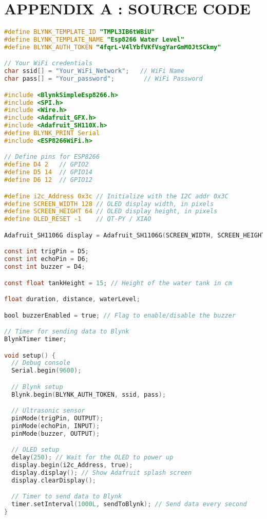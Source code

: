 \section*{APPENDIX A : SOURCE CODE}
        
\begin{lstlisting}[language=C]    
#define BLYNK_TEMPLATE_ID "TMPL3IB6tWBiU"
#define BLYNK_TEMPLATE_NAME "Esp8266 Water Level"
#define BLYNK_AUTH_TOKEN "4fqrL-V4lYbfVKfVsgYarGmM0JtSCkmy"

// Your WiFi credentials
char ssid[] = "Your_WiFi_Network";   // WiFi Name
char pass[] = "Your_password";        // WiFi Password

#include <BlynkSimpleEsp8266.h>
#include <SPI.h>
#include <Wire.h>
#include <Adafruit_GFX.h>
#include <Adafruit_SH110X.h>
#define BLYNK_PRINT Serial
#include <ESP8266WiFi.h>

// Define pins for ESP8266
#define D4 2   // GPIO2
#define D5 14  // GPIO14
#define D6 12  // GPIO12

#define i2c_Address 0x3c // Initialize with the I2C addr 0x3C
#define SCREEN_WIDTH 128 // OLED display width, in pixels
#define SCREEN_HEIGHT 64 // OLED display height, in pixels
#define OLED_RESET -1    // QT-PY / XIAO

Adafruit_SH1106G display = Adafruit_SH1106G(SCREEN_WIDTH, SCREEN_HEIGHT, &Wire, OLED_RESET);

const int trigPin = D5;
const int echoPin = D6;
const int buzzer = D4;

const float tankHeight = 15; // Height of the water tank in cm

float duration, distance, waterLevel;

bool buzzerEnabled = true; // Flag to enable/disable the buzzer

// Timer for sending data to Blynk
BlynkTimer timer;

void setup() {
  // Debug console
  Serial.begin(9600);

  // Blynk setup
  Blynk.begin(BLYNK_AUTH_TOKEN, ssid, pass);

  // Ultrasonic sensor
  pinMode(trigPin, OUTPUT);
  pinMode(echoPin, INPUT);
  pinMode(buzzer, OUTPUT);

  // OLED setup
  delay(250); // Wait for the OLED to power up
  display.begin(i2c_Address, true);
  display.display(); // Show Adafruit splash screen
  display.clearDisplay();

  // Timer to send data to Blynk
  timer.setInterval(1000L, sendToBlynk); // Send data every second
}


\end{lstlisting}
